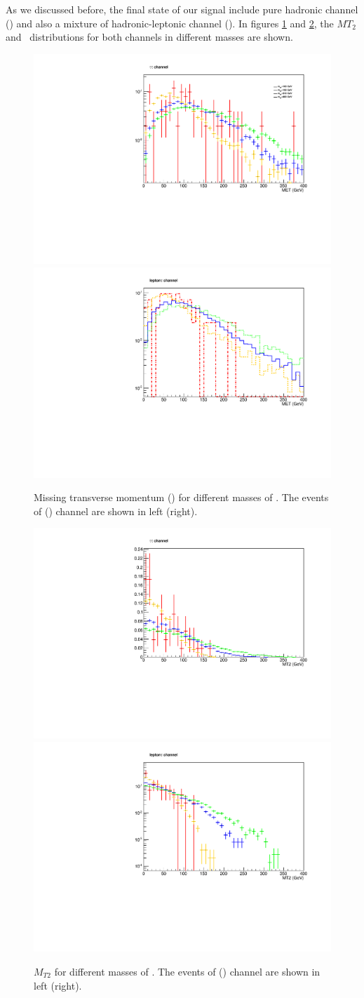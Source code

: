 As we discussed before, the final state of our signal include pure hadronic channel (\tauTau) and also a mixture of hadronic-leptonic channel (\lepTau ).  In figures \ref{fig:met} and \ref{fig:mt2}, the $MT_2$ and \MET  ~distributions for both channels in different \wprime masses are shown.
\begin{figure}[!htb]
\centering
\includegraphics*[width=.45\textwidth]{figs/MET_hh.pdf}
\hspace{3mm}
\includegraphics*[width=.45\textwidth]{figs/MET_lh.pdf}
\caption{Missing transverse momentum (\MET) for different masses of \wprime. The events of \tauTau(\lepTau) channel are shown in left (right).}
\label{fig:met}
\end{figure}
\begin{figure}[htb]
\centering
\includegraphics*[width=.45\textwidth]{figs/MT2_hh.pdf}
\hspace{3mm}
\includegraphics*[width=.45\textwidth]{figs/MT2_lh.pdf}
\caption{$M_{T2}$ for different masses of \wprime. The events of \tauTau (\lepTau) channel are shown in left (right).}
\label{fig:mt2}
\end{figure} 
